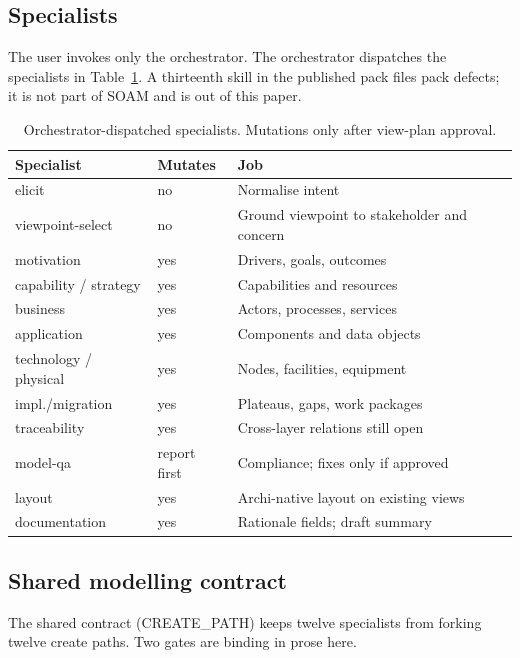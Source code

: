 \documentclass[10pt,journal,compsoc]{IEEEtran}
\begin{document}
\subsection{Specialists}

The user invokes only the orchestrator. The orchestrator dispatches the specialists in Table~\ref{tab:specialists}. A thirteenth skill in the published pack files pack defects; it is not part of SOAM and is out of this paper.

\begin{table}[!t]
\caption{Orchestrator-dispatched specialists. Mutations only after view-plan approval.}
\label{tab:specialists}
\centering
{\scriptsize
\begin{tabularx}{\columnwidth}{@{}>{\raggedright\arraybackslash}p{} >{\centering\arraybackslash}p{} >{\raggedright\arraybackslash}X@{}}
\toprule
\textbf{Specialist} & \textbf{Mutates} & \textbf{Job} \\
\midrule
elicit & no & Normalise intent \\
viewpoint-select & no & Ground viewpoint to stakeholder and concern \\
motivation & yes & Drivers, goals, outcomes \\
capability / strategy & yes & Capabilities and resources \\
business & yes & Actors, processes, services \\
application & yes & Components and data objects \\
technology / physical & yes & Nodes, facilities, equipment \\
impl./migration & yes & Plateaus, gaps, work packages \\
traceability & yes & Cross-layer relations still open \\
model-qa & report first & Compliance; fixes only if approved \\
layout & yes & Archi-native layout on existing views \\
documentation & yes & Rationale fields; draft summary \\
\bottomrule
\end{tabularx}}
\end{table}

\subsection{Shared modelling contract}

The shared contract (CREATE\_PATH) keeps twelve specialists from forking twelve create paths. Two gates are binding in prose here.
\end{document}
